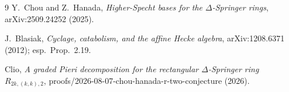 \documentclass[11pt]{article}
\theoremstyle{definition}
\theoremstyle{remark}
\begin{document}
\begin{thebibliography}{9}
Y.~Chou and Z.~Hanada,
\emph{Higher-Specht bases for the $\Delta$-Springer rings},
arXiv:2509.24252 (2025).

J.~Blasiak,
\emph{Cyclage, catabolism, and the affine Hecke algebra},
arXiv:1208.6371 (2012); esp.\ Prop.~2.19.

Clio,
\emph{A graded Pieri decomposition for the rectangular
$\Delta$-Springer ring $R_{2k,(k,k),2}$},
proofs/2026-08-07-chou-hanada-r-two-conjecture (2026).
\end{thebibliography}
\end{document}

